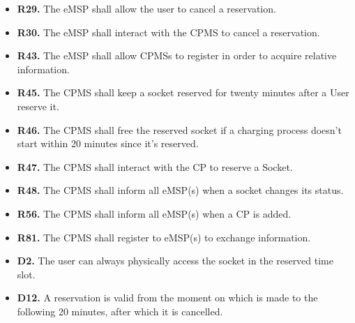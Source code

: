 \documentclass{Configuration_Files/PoliMi3i_thesis}
\begin{document}
\begin{enumerate}[label=\textbf{G\arabic*}]
\begin{itemize}
            \item \textbf{R29.} The eMSP shall allow the user to cancel a reservation.
            \item \textbf{R30.} The eMSP shall interact with the CPMS to cancel a reservation.
            \item \textbf{R43.} The eMSP shall allow CPMSs to register in order to acquire relative information.
            \item \textbf{R45.} The CPMS shall keep a socket reserved for twenty minutes after a User reserve it.
            \item \textbf{R46.} The CPMS shall free the reserved socket if a charging process doesn’t start within 20 minutes since it's reserved.
            \item \textbf{R47.} The CPMS shall interact with the CP to reserve a Socket.
            \item \textbf{R48.} The CPMS shall inform all eMSP(s) when a socket changes its status.
            \item \textbf{R56.} The CPMS shall inform all eMSP(s) when a CP is added.
            \item \textbf{R81.} The CPMS shall register to eMSP(s) to exchange information.
            \item \textbf{D2.} The user can always physically access the socket in the reserved time slot.
            \item \textbf{D12.} A reservation is valid from the moment on which is made to the following 20 minutes, after which it is cancelled.
        \end{itemize}
    

\end{enumerate}
\end{document}
